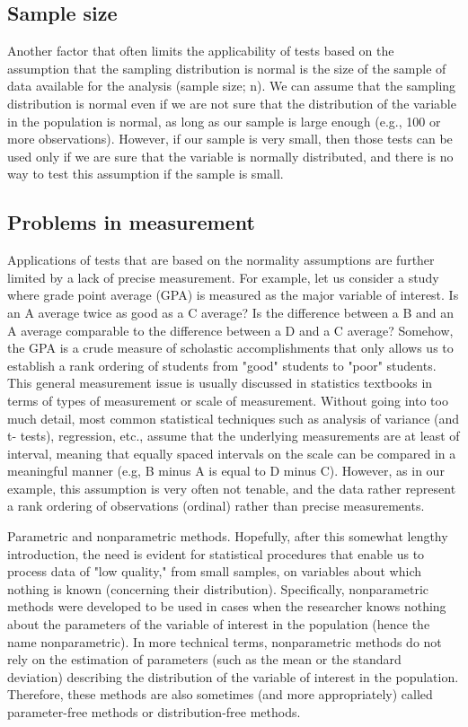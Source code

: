 
\subsection{Sample size} 
Another factor that often limits the applicability of tests based on the assumption that the sampling distribution is normal is the size of the sample of data available for the analysis (sample size; n). We can assume that the sampling distribution is normal even if we are not sure that the distribution of the variable in the population is normal, as long as our sample is large enough (e.g., 100 or more observations). However, if our sample is very small, then those tests can be used only if we are sure that the variable is normally distributed, and there is no way to test this assumption if the sample is small.

\subsection{Problems in measurement}
Applications of tests that are based on the normality assumptions are further limited by a lack of precise measurement. For example, let us consider a study where grade point average (GPA) is measured as the major variable of interest. Is an A average twice as good as a C average? Is the difference between a B and an A average comparable to the difference between a D and a C average? Somehow, the GPA is a crude measure of scholastic accomplishments that only allows us to establish a rank ordering of students from "good" students to "poor" students. This general measurement issue is usually discussed in statistics textbooks in terms of types of measurement or scale of measurement. Without going into too much detail, most common statistical techniques such as analysis of variance (and t- tests), regression, etc., assume that the underlying measurements are at least of interval, meaning that equally spaced intervals on the scale can be compared in a meaningful manner (e.g, B minus A is equal to D minus C). However, as in our example, this assumption is very often not tenable, and the data rather represent a rank ordering of observations (ordinal) rather than precise measurements.

Parametric and nonparametric methods. Hopefully, after this somewhat lengthy introduction, the need is evident for statistical procedures that enable us to process data of "low quality," from small samples, on variables about which nothing is known (concerning their distribution). Specifically, nonparametric methods were developed to be used in cases when the researcher knows nothing about the parameters of the variable of interest in the population (hence the name nonparametric). In more technical terms, nonparametric methods do not rely on the estimation of parameters (such as the mean or the standard deviation) describing the distribution of the variable of interest in the population. Therefore, these methods are also sometimes (and more appropriately) called parameter-free methods or distribution-free methods.

